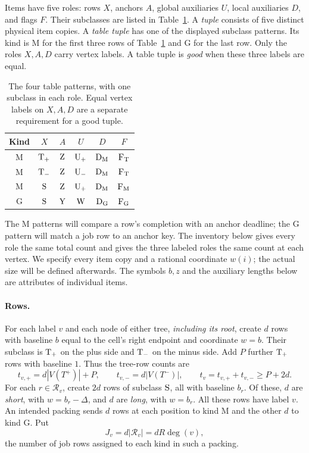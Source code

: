 Items have five roles: rows $X$, anchors $A$, global auxiliaries $U$,
local auxiliaries $D$, and flags $F$. Their subclasses are listed in
Table~\ref{tab:patterns}. A \emph{tuple} consists of five distinct
physical item copies. A \emph{table tuple} has one of the displayed
subclass patterns. Its kind is $\mathrm M$ for the first three rows of
Table~\ref{tab:patterns} and $\mathrm G$ for the last row. Only the roles $X,A,D$
carry vertex labels. A table tuple is \emph{good} when these three
labels are equal.

\begin{table}[htbp]
 \centering
 \begin{tabular}{c c c c c c}
  \toprule
  Kind & $X$ & $A$ & $U$ & $D$ & $F$\\
  \midrule
  $\mathrm M$ & $\mathrm{T}_{+}$ & $\mathrm{Z}$ & $\mathrm{U}_{+}$ & $\mathrm{D}_{\mathrm M}$ & $\mathrm{F}_{\mathrm T}$\\
  $\mathrm M$ & $\mathrm{T}_{-}$ & $\mathrm{Z}$ & $\mathrm{U}_{-}$ & $\mathrm{D}_{\mathrm M}$ & $\mathrm{F}_{\mathrm T}$\\
  $\mathrm M$ & $\mathrm{S}$ & $\mathrm{Z}$ & $\mathrm{U}_{+}$ & $\mathrm{D}_{\mathrm M}$ & $\mathrm{F}_{\mathrm M}$\\
  $\mathrm G$ & $\mathrm{S}$ & $\mathrm{Y}$ & $\mathrm{W}$ & $\mathrm{D}_{\mathrm G}$ & $\mathrm{F}_{\mathrm G}$\\
  \bottomrule
 \end{tabular}
 \caption{The four table patterns, with one subclass in each role.
 Equal vertex labels on $X,A,D$ are a separate requirement for a good tuple.}
 \label{tab:patterns}
\end{table}

The $\mathrm M$ patterns will compare a row's completion with an
anchor deadline; the $\mathrm G$ pattern will match a job row to an
anchor key. The inventory below gives every role the same total count
and gives the three labeled roles the same count at each vertex.
We specify every item copy and a rational coordinate $w(i)$; the actual
size will be defined afterwards. The symbols $b,z$ and the auxiliary
lengths below are attributes of individual items.

\paragraph{Rows.}
For each label $v$ and each node of either tree, \emph{including its
root}, create $d$ rows with baseline $b$ equal to the cell's right
endpoint and coordinate $w=b$. Their subclass is $\mathrm{T}_{+}$ on the plus
side and $\mathrm{T}_{-}$ on the minus side. Add $P$ further $\mathrm{T}_{+}$ rows with
baseline $1$. Thus the tree-row counts are
\begin{equation}\label{eq:tree-row-counts}
 t_{v,+}=d|V(T^+)|+P,\qquad
 t_{v,-}=d|V(T^-)|,\qquad
 t_v=t_{v,+}+t_{v,-}\ge P+2d.
\end{equation}
For each $r\in\mathcal R_v$, create $2d$ rows of subclass $\mathrm{S}$,
all with baseline $b_r$. Of these, $d$ are \emph{short}, with
$w=b_r-\Delta$, and $d$ are \emph{long}, with $w=b_r$.
All these rows have label $v$. An intended packing sends $d$ rows at
each position to kind $\mathrm M$ and the other $d$ to kind $\mathrm G$.
Put
\[
 J_v=d|\mathcal R_v|=dR\deg(v),
\]
the number of job rows assigned to each kind in such a packing.

